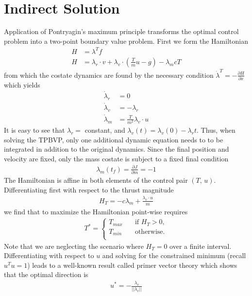 \documentclass[10pt,a4paper]{article}
\begin{document}
\section{Indirect Solution}
Application of Pontryagin's maximum principle transforms the optimal control problem into a two-point boundary value problem. First we form the Hamiltonian
\begin{align}
H &= \lambda^Tf \\
H &= \lambda_r\cdot v + \lambda_v\cdot(\frac{T}{m}u - g) - \lambda_m c T
\end{align}
from which the costate dynamics are found by the necessary condition $\dot{\lambda}^T = -\frac{\partial H}{\partial x}$ which yields
\begin{align}
\dot{\lambda}_r &= 0 \\
\dot{\lambda}_v &= -\lambda_r \\
\dot{\lambda}_m &= \frac{T}{m^2}\lambda_v\cdot u
\end{align}
It is easy to see that $\lambda_r=$ constant, and $\lambda_v(t) = \lambda_v(0)-\lambda_rt$. Thus, when solving the TPBVP, only one additional dynamic equation needs to to be integrated in addition to the original dynamics. Since the final position and velocity are fixed, only the mass costate is subject to a fixed final condition
\begin{align}
\lambda_m(t_f) = \frac{\partial J}{\partial m} = -1
\end{align}
The Hamiltonian is affine in both elements of the control pair $(T,\,u)$. Differentiating first with respect to the thrust magnitude 
\begin{align}
H_T = -c\lambda_m + \frac{\lambda_v\cdot u}{m}
\end{align}
we find that to maximize the Hamiltonian point-wise requires
\begin{align}
T^* = 
     \begin{cases}
       T_{max} &\quad\text{if }H_T>0,\\
       T_{min} &\quad\text{otherwise.} \\ 
     \end{cases}
\end{align}
Note that we are neglecting the scenario where $ H_T=0 $ over a finite interval. Differentiating with respect to $u$ and solving for the constrained minimum (recall $u^Tu=1$) leads to a well-known result called primer vector theory which shows that the optimal direction is 
\begin{align}
u^* = -\frac{\lambda_v}{||\lambda_v||}
\end{align}
\end{document}
